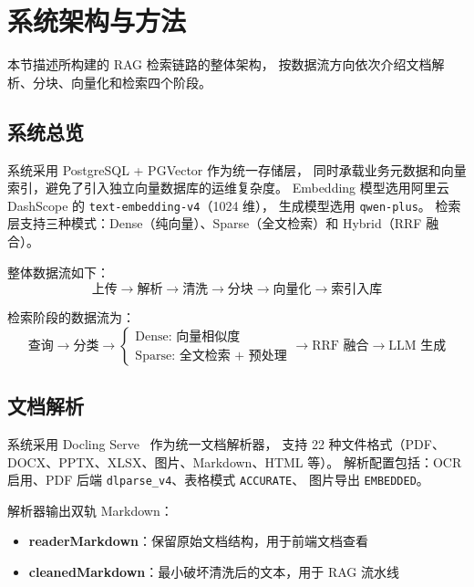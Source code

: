\documentclass[a4paper, 12pt]{ctexart}
\begin{document}
\section{系统架构与方法}

本节描述所构建的 RAG 检索链路的整体架构，
按数据流方向依次介绍文档解析、分块、向量化和检索四个阶段。

\subsection{系统总览}

系统采用 PostgreSQL + PGVector 作为统一存储层，
同时承载业务元数据和向量索引，避免了引入独立向量数据库的运维复杂度。
Embedding 模型选用阿里云 DashScope 的 \texttt{text-embedding-v4}（1024 维），
生成模型选用 \texttt{qwen-plus}。
检索层支持三种模式：Dense（纯向量）、Sparse（全文检索）和 Hybrid（RRF 融合）。

整体数据流如下：
\begin{equation}
  \text{上传} \rightarrow \text{解析} \rightarrow \text{清洗} \rightarrow
  \text{分块} \rightarrow \text{向量化} \rightarrow \text{索引入库}
\end{equation}

检索阶段的数据流为：
\begin{equation}
  \text{查询} \rightarrow \text{分类} \rightarrow
  \begin{cases}
    \text{Dense: 向量相似度} \\
    \text{Sparse: 全文检索 + 预处理}
  \end{cases}
  \rightarrow \text{RRF 融合} \rightarrow \text{LLM 生成}
\end{equation}

\subsection{文档解析}

系统采用 Docling Serve~\cite{docling} 作为统一文档解析器，
支持 22 种文件格式（PDF、DOCX、PPTX、XLSX、图片、Markdown、HTML 等）。
解析配置包括：OCR 启用、PDF 后端 \texttt{dlparse\_v4}、表格模式 \texttt{ACCURATE}、
图片导出 \texttt{EMBEDDED}。

解析器输出双轨 Markdown：
\begin{itemize}
  \item \textbf{readerMarkdown}：保留原始文档结构，用于前端文档查看
  \item \textbf{cleanedMarkdown}：最小破坏清洗后的文本，用于 RAG 流水线
\end{itemize}
\end{document}
